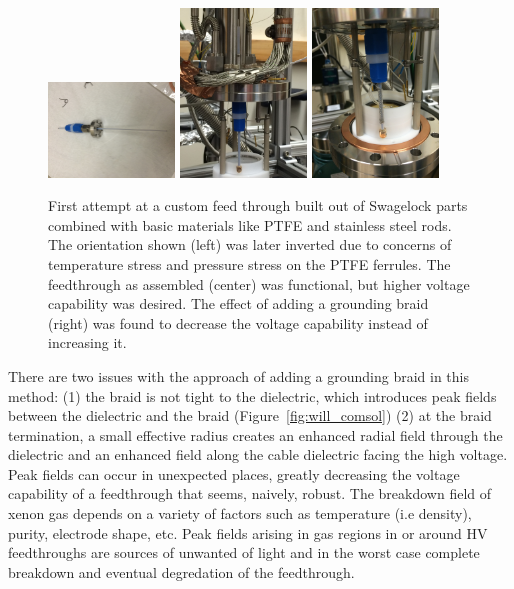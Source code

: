 \begin{figure}[htbp]
\begin{center}
\includegraphics[width=0.3\textwidth, angle=-90]{figures/testbed/ft4_1.jpg}
\includegraphics[width=0.3\textwidth, angle=-90]{figures/testbed/ft4_2.jpg}
\includegraphics[width=0.3\textwidth, angle=-90]{figures/testbed/ft4_3.jpg}

\caption{First attempt at a custom feed through built out of Swagelock parts combined with basic materials like PTFE and stainless steel rods. The orientation shown (left) was later inverted due to concerns of temperature stress and pressure stress on the PTFE ferrules. The feedthrough as assembled (center) was functional, but higher voltage capability was desired. The effect of adding a grounding braid (right) was found to decrease the voltage capability instead of increasing it.  }
\label{fig:ft4}
\end{center}
\end{figure}


There are two issues with the approach of adding a grounding braid in this method: (1) the braid is not tight to the dielectric, which introduces peak fields between the dielectric and the braid (Figure~\ref{fig:will_comsol}) (2) at the braid termination, a small effective radius creates an enhanced radial field through the  dielectric and an enhanced field along the cable dielectric facing the high voltage. Peak fields can occur in unexpected places, greatly decreasing the voltage capability of a feedthrough that seems, naively, robust. The breakdown field of xenon gas depends on a variety of factors such as temperature (i.e density), purity, electrode shape, etc. Peak fields arising in gas regions in or around \ac{HV} feedthroughs are sources of unwanted of light and in the worst case complete breakdown and eventual degredation of the feedthrough. 

